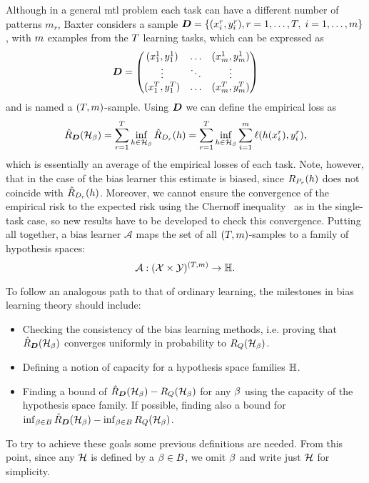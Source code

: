 Although in a general \acrshort{mtl} problem each task can have a different number of patterns $m_r$, Baxter considers a sample $\bm{D}=\{(x_i^r, y_i^r), r=1, \ldots, T, \; i=1, \ldots, m \}$, with $m$ examples from the $T$ learning tasks, which can be expressed as
\begin{equation}
    \nonumber
    \bm{D} = 
    \begin{pmatrix}
        (x_1^1, y_1^1) & \ldots & (x_m^1, y_m^1) \\
        \vdots & \ddots & \vdots \\
        (x_1^T, y_1^T) & \ldots & (x_m^T, y_m^T) \\
    \end{pmatrix}
\end{equation}
and is named a $(T, m)$-sample.
Using $\bm{D}$ we can define the empirical loss as
\begin{equation}\label{eq:biaslearn_emprisk}
    \bemprisk(\hypspace_\fparam) = \sum_{r=1}^\ntasks \inf_{\hypf \in \hypspace_\fparam} \hat{\risk}_{\sample_r}(\hypf) = \sum_{r=1}^\ntasks \inf_{\hypf \in \hypspace_\fparam} \sum_{i=1}^m \lossf(\hypf(x_i^r), y_i^r),
\end{equation}
which is essentially an average of the empirical losses of each task. 
Note, however, that in the case of the bias learner this estimate is biased, since $R_{P_r}(h)$ does not coincide with $\hat{R}_{D_r}(h)$. 
%
Moreover, we cannot ensure the convergence of the empirical risk to the expected risk using the Chernoff inequality~\citep{Chernoff52} as in the single-task case, so new results have to be developed to check this convergence.
%
Putting all together, a bias learner $\mathcal{A}$ maps the set of all $(T, m)$-samples to a family of hypothesis spaces:
\begin{equation}
    \nonumber
    \mathcal{A} : {(\mathcal{X} \times \mathcal{Y})^{(T, m)}} \to \mathbb{H}.
\end{equation}
%

To follow an analogous path to that of ordinary learning, the milestones in bias learning theory should include:
\begin{itemize}
    \item Checking the consistency of the bias learning methods, i.e. proving that $\hat{R}_{\bm{D}}(\mathcal{H}_\beta)$ converges uniformly in probability to $R_Q(\mathcal{H}_\beta)$.
    \item Defining a notion of capacity for a hypothesis space families $\mathbb{H}$.
    \item Finding a bound of $\hat{R}_{\bm{D}}(\mathcal{H}_\beta) - R_Q(\mathcal{H}_\beta)$ for any $\beta$ using the capacity of the hypothesis space family. If possible, finding also a bound for $\inf_{\beta \in B}\hat{R}_{\bm{D}}(\mathcal{H}_\beta) - \inf_{\beta \in B} R_Q(\mathcal{H}_\beta)$.
\end{itemize}
To try to achieve these goals some previous definitions are needed. From this point, since any $\mathcal{H}$ is defined by a $\beta \in B$, we omit $\beta$ and write just $\mathcal{H}$ for simplicity.
%



